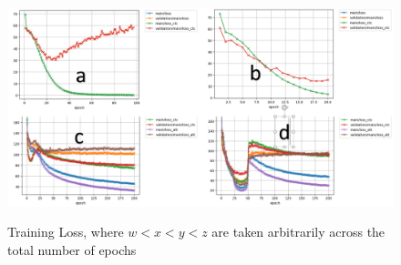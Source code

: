 \stopblue

\begin{figure}
\centering
  \includegraphics[width=14cm]{thesis/images/scatter_res.PNG}\\
  \caption{Training Loss, where $w<x<y<z$ are taken arbitrarily across the
total number of epochs} \label{fig_6_2_loss}
\end{figure}

